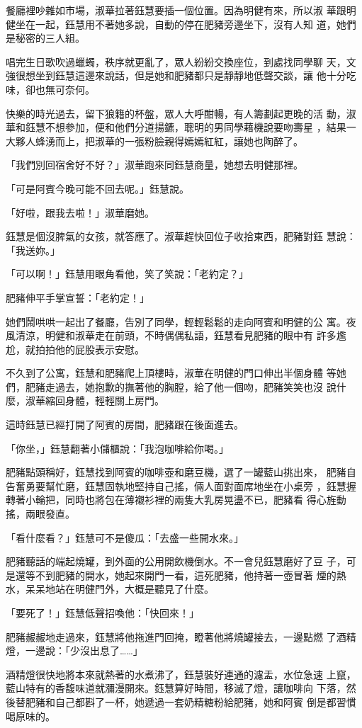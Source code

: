 餐廳裡吵雜如市場，淑華拉著鈺慧要插一個位置。因為明健有來，所以淑
華跟明健坐在一起，鈺慧用不著她多說，自動的停在肥豬旁邊坐下，沒有人知
道，她們是秘密的三人組。

唱完生日歌吹過蠟蠋，秩序就更亂了，眾人紛紛交換座位，到處找同學聊
天，文強很想坐到鈺慧這邊來說話，但是她和肥豬都只是靜靜地低聲交談，讓
他十分吃味，卻也無可奈何。

快樂的時光過去，留下狼籍的杯盤，眾人大呼酣暢，有人籌劃起更晚的活
動，淑華和鈺慧不想參加，便和他們分道揚鑣，聰明的男同學藉機說要吻壽星
，結果一大夥人蜂湧而上，把淑華的一張粉臉親得嫣嫣紅紅，讓她也陶醉了。

「我們別回宿舍好不好？」淑華跑來同鈺慧商量，她想去明健那裡。

「可是阿賓今晚可能不回去呢。」鈺慧說。

「好啦，跟我去啦！」淑華磨她。

鈺慧是個沒脾氣的女孩，就答應了。淑華趕快回位子收拾東西，肥豬對鈺
慧說：「我送妳。」

「可以啊！」鈺慧用眼角看他，笑了笑說：「老約定？」

肥豬伸平手掌宣誓：「老約定！」

她們鬧哄哄一起出了餐廳，告別了同學，輕輕鬆鬆的走向阿賓和明健的公
寓。夜風清涼，明健和淑華走在前頭，不時偶偶私語，鈺慧看見肥豬的眼中有
許多尷尬，就拍拍他的屁股表示安慰。

不久到了公寓，鈺慧和肥豬爬上頂樓時，淑華在明健的門口伸出半個身體
等她們，肥豬走過去，她抱歉的撫著他的胸膛，給了他一個吻，肥豬笑笑也沒
說什麼，淑華縮回身體，輕輕關上房門。

這時鈺慧已經打開了阿賓的房間，肥豬跟在後面進去。

「你坐，」鈺慧翻著小儲櫃說：「我泡咖啡給你喝。」

肥豬點頭稱好，鈺慧找到阿賓的咖啡壺和磨豆機，選了一罐藍山挑出來，
肥豬自告奮勇要幫忙磨，鈺慧固執地堅持自己搖，倆人面對面席地坐在小桌旁
，鈺慧握轉著小輪把，同時也將包在薄襯衫裡的兩隻大乳房晃盪不已，肥豬看
得心旌動搖，兩眼發直。

「看什麼看？」鈺慧可不是傻瓜：「去盛一些開水來。」

肥豬聽話的端起燒罐，到外面的公用開飲機倒水。不一會兒鈺慧磨好了豆
子，可是還等不到肥豬的開水，她起來開門一看，這死肥豬，他持著一壺冒著
煙的熱水，呆呆地站在明健門外，大概是聽見了什麼。

「要死了！」鈺慧低聲招喚他：「快回來！」

肥豬赧赧地走過來，鈺慧將他拖進門回掩，瞪著他將燒罐接去，一邊點燃
了酒精燈，一邊說：「少沒出息了……」

酒精燈很快地將本來就熱著的水煮沸了，鈺慧裝好連通的濾盂，水位急速
上竄，藍山特有的香馥味道就瀰漫開來。鈺慧算好時間，移滅了燈，讓咖啡向
下落，然後替肥豬和自己都斟了一杯，她遞過一套奶精糖粉給肥豬，她和阿賓
倒是都習慣喝原味的。

